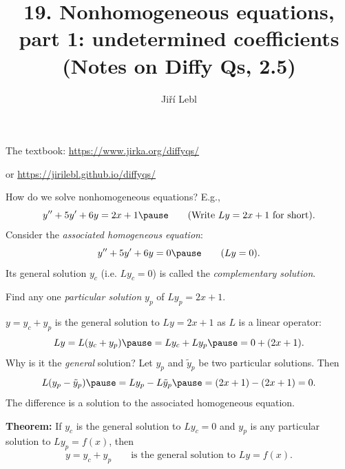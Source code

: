 \documentclass[10pt,aspectratio=169]{beamer}
\author{Ji\v{r}\'i Lebl}
\institute[OSU]{%
Oklahoma State University%
}
\title{19. Nonhomogeneous equations,\\part 1: undetermined coefficients\\(Notes on Diffy Qs, 2.5)}
\date{}
\begin{document}
\begin{frame}
\titlepage


\begin{center}
The textbook: \url{https://www.jirka.org/diffyqs/}

or \url{https://jirilebl.github.io/diffyqs/}
\end{center}
\end{frame}

\begin{frame}
How do we solve nonhomogeneous equations?  E.g.,
\[
y'' + 5y'+ 6y = 2x+1
\pause
\qquad
\text{(Write $Ly = 2x+1$ for short).}
\]
\pause
Consider the \emph{associated homogeneous equation}:
\[
y'' + 5y'+ 6y = 0
\pause
\qquad
\text{($Ly = 0$).}
\]
\pause
Its general solution $y_c$ (i.e. $Ly_c = 0$) is called the
\emph{complementary solution}.

\medskip
\pause

Find any one \emph{particular solution} $y_p$ of $Ly_p=2x+1$.

\medskip
\pause

$y = y_c + y_p$ \quad is the general solution to $Ly=2x+1$
as $L$ is a linear operator:
\pause
\[
L y = L ( y_c + y_p) \pause = L y_c + L y_p \pause = 0 + (2x+1).
\]
\pause
Why is it the \emph{general} solution?
Let
$y_p$ and $\tilde{y}_p$ be two particular solutions.
Then
\[
L(y_p-\tilde{y}_p) \pause =
Ly_p-L\tilde{y}_p \pause =
(2x+1)-(2x+1) = 0 .
\]
\pause
The difference is a solution to the
associated homogeneous equation.

\medskip
\pause

\textbf{Theorem:} If $y_c$ is the general solution to $Ly_c = 0$
and $y_p$ is any particular solution to $Ly_p = f(x)$, then
\[
y=y_c+y_p
\qquad
\text{is the general solution to $Ly = f(x)$.}
\]
\end{frame}
\end{document}
